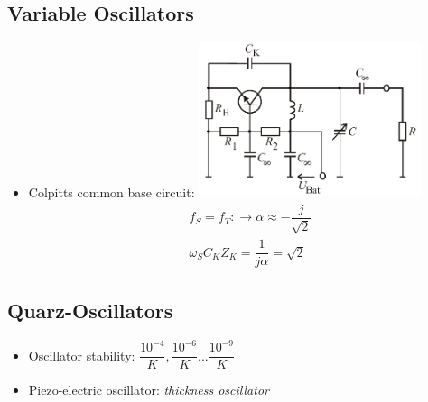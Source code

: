 \subsection{Variable Oscillators}
\begin{itemize}
    \itemsep0pt
    \item Colpitts common base circuit:
        \includegraphics[width=6.5cm]{content/hfcomp/pictures/colpitts_bipolar_common_base_oscillator.png}
        \begin{align*}
            &f_S = f_T: \to \alpha \approx -\dfrac{j}{\sqrt{2}}\\
            &\omega_S C_K Z_K = \dfrac{1}{j\alpha} = \sqrt{2}
        \end{align*}
\end{itemize}
\subsection{Quarz-Oscillators}
\begin{itemize}
    \itemsep0pt
    \item Oscillator stability: $\dfrac{10^{-4}}{K},\dfrac{10^{-6}}{K}...\dfrac{10^{-9}}{K}$
    \item Piezo-electric oscillator: \textit{thickness oscillator}
\end{itemize}

